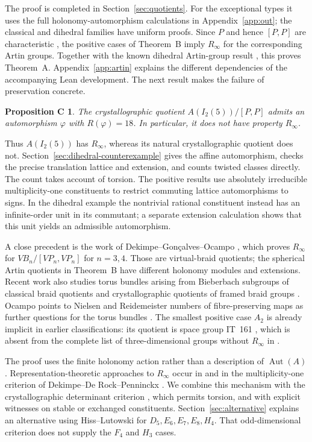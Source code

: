 \documentclass[11pt]{article}
\newtheorem*{counterprop}{Proposition C}
\theoremstyle{definition}
\newcommand{\Aut}{\operatorname{Aut}}
\newcommand{\Rinf}{R_\infty}
\begin{document}
The proof is completed in Section~\ref{sec:quotients}. For the exceptional types it uses the full
holonomy-automorphism calculations in Appendix~\ref{app:out}; the classical and dihedral families have
uniform proofs. Since $P$ and hence $[P,P]$ are characteristic \cite{CP03}, the positive cases of Theorem~B
imply $\Rinf$ for the corresponding Artin groups. Together with the known dihedral Artin-group result
\cite{CS22}, this proves Theorem~A. Appendix~\ref{app:artin} explains the different dependencies of the accompanying Lean development.
The next result makes the failure of preservation concrete.

\begin{counterprop}
The crystallographic quotient $A(I_2(5))/[P,P]$ admits an automorphism $\varphi$ with $R(\varphi)=18$.
In particular, it does not have property $\Rinf$.
\end{counterprop}

Thus $A(I_2(5))$ has $\Rinf$, whereas its natural crystallographic quotient does not.
Section~\ref{sec:dihedral-counterexample} gives the affine automorphism, checks the precise translation lattice
and extension, and counts twisted classes directly. The count takes account of torsion.
The positive results use absolutely irreducible multiplicity-one constituents to restrict commuting lattice
automorphisms to signs. In the dihedral example the nontrivial rational constituent instead has an infinite-order unit
in its commutant; a separate extension calculation shows that this unit yields an admissible automorphism.

A close precedent is the work of Dekimpe--Gon\c{c}alves--Ocampo \cite[Thms.~28, 31 and proof of Cor.~32]{DGO24}, which proves
$\Rinf$ for $VB_n/[VP_n,VP_n]$ for $n=3,4$. Those are virtual-braid quotients; the spherical Artin quotients
in Theorem~B have different holonomy modules and extensions.
Recent work also studies torus bundles arising from Bieberbach subgroups of classical braid quotients
\cite{Oca26} and crystallographic quotients of framed braid groups \cite{LOST26}.
Ocampo points to Nielsen and Reidemeister numbers of fibre-preserving maps as further questions for
the torus bundles \cite[\S1]{Oca26}.
The smallest positive case $A_2$ is already implicit in earlier classifications: its quotient is space
group IT~161 \cite[\S5]{GGO17}, which is absent from the complete list of three-dimensional groups
without $\Rinf$ in \cite[Table~2]{DKT19}.

The proof uses the finite holonomy action rather than a description of $\Aut(A)$.
Representation-theoretic approaches to $\Rinf$ occur in \cite{DGO21} and in the multiplicity-one criterion
of Dekimpe--De Rock--Penninckx \cite[Thm.~4.7]{DDP09}. We combine this mechanism with the
crystallographic determinant criterion \cite[Cor.~3.10]{DP11}, which permits torsion, and with
explicit witnesses on stable or exchanged constituents. Section~\ref{sec:alternative} explains an
alternative using Hiss--Lutowski \cite{HL25,HL26} for $D_5,E_6,E_7,E_8,H_4$.
That odd-dimensional criterion does not supply the $F_4$ and $H_3$ cases.
\end{document}
